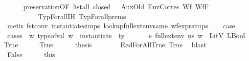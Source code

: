 \begin{isabellebody}
\ \ \ \ \isamarkupfalse%
\ preservation{\isacharparenleft}{\kern0pt}{}{\isacharparenright}{\kern0pt}{\isacharbrackleft}{\kern0pt}OF\ {\isacartoucheopen}list{\isacharunderscore}{\kern0pt}all\ closed\ {\isasymOmega}{\isacartoucheclose}\ {\isacharunderscore}{\kern0pt}\ AuxOld\ EnvCorres\ Wf{\isacharunderscore}{\kern0pt}{\isasymGamma}\ Wf{\isacharunderscore}{\kern0pt}F\ {\isacharunderscore}{\kern0pt}\ {\isacharunderscore}{\kern0pt}\ {\isacharbrackright}{\kern0pt}\isanewline
\ \ \ \ \ \ \ \ \ \ TypForall{\isachardot}{\kern0pt}IH{\isacharparenleft}{\kern0pt}{}{\isacharparenright}{\kern0pt}\ TypForall{\isachardot}{\kern0pt}prems\ \isanewline
\ \ \ \ \isamarkupfalse%
\ {\isacharparenleft}{\kern0pt}metis\ fst{\isacharunderscore}{\kern0pt}conv\ instantiate{\isachardot}{\kern0pt}simps{\isacharparenleft}{\kern0pt}{}{\isacharparenright}{\kern0pt}\ lookup{\isacharunderscore}{\kern0pt}full{\isacharunderscore}{\kern0pt}ext{\isacharunderscore}{\kern0pt}env{\isacharunderscore}{\kern0pt}same\ wf{\isacharunderscore}{\kern0pt}expr{\isachardot}{\kern0pt}simps{\isacharparenleft}{\kern0pt}{}{}{\isacharparenright}{\kern0pt}{\isacharparenright}{\kern0pt}\isanewline
\ \ \isamarkupfalse%
\ {\isacharquery}{\kern0pt}case\isanewline
\ \ \isamarkupfalse%
\ {\isacharparenleft}{\kern0pt}cases\ {\isachardoublequoteopen}{\isasymforall}\ w{\isachardot}{\kern0pt}\ type{\isacharunderscore}{\kern0pt}of{\isacharunderscore}{\kern0pt}val\ w\ {\isacharequal}{\kern0pt}\ instantiate\ {\isasymOmega}\ ty\ {\isasymlongrightarrow}\ \ {\isasymLambda}{\isacharcomma}{\kern0pt}\ {\isasymGamma}{\isacharcomma}{\kern0pt}\ {\isasymOmega}\ {\isasymturnstile}\ {\isasymlangle}e{\isacharcomma}{\kern0pt}\ full{\isacharunderscore}{\kern0pt}ext{\isacharunderscore}{\kern0pt}env\ n{\isacharunderscore}{\kern0pt}s\ w{\isasymrangle}\ {\isasymDown}\ LitV\ {\isacharparenleft}{\kern0pt}LBool\ True{\isacharparenright}{\kern0pt}{\isachardoublequoteclose}{\isacharparenright}{\kern0pt}\isanewline
\ \ \ \ \isamarkupfalse%
\ True\isanewline
\ \ \ \ \isamarkupfalse%
\ {\isacharquery}{\kern0pt}thesis\isanewline
\ \ \ \ \ \ \isamarkupfalse%
\ RedForAllTrue\ True\ \isamarkupfalse%
\ blast\ \ \ \isanewline
\ \ \isamarkupfalse%
\isanewline
\ \ \ \ \isamarkupfalse%
\ False\isanewline
\ \ \ \ \isamarkupfalse%
\ this\ \isamarkupfalse%

\end{isabellebody}
